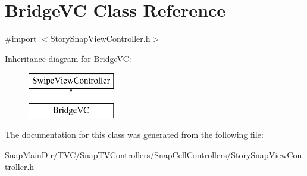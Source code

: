 \hypertarget{interface_bridge_v_c}{}\section{Bridge\+VC Class Reference}
\label{interface_bridge_v_c}


{\ttfamily \#import $<$Story\+Snap\+View\+Controller.\+h$>$}

Inheritance diagram for Bridge\+VC\+:\begin{figure}[H]
\begin{center}
\leavevmode
\includegraphics[height=2.000000cm]{interface_bridge_v_c}
\end{center}
\end{figure}


The documentation for this class was generated from the following file\+:\begin{DoxyCompactItemize}
\item 
Snap\+Main\+Dir/\+T\+V\+C/\+Snap\+T\+V\+Controllers/\+Snap\+Cell\+Controllers/\hyperlink{_story_snap_view_controller_8h}{Story\+Snap\+View\+Controller.\+h}\end{DoxyCompactItemize}
